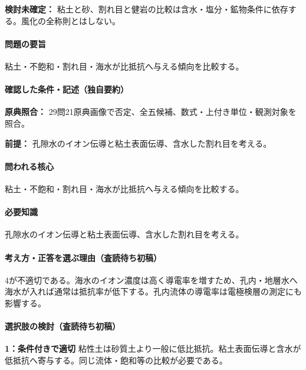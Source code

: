 \par\textbf{検討未確定：} 粘土と砂、割れ目と健岩の比較は含水・塩分・鉱物条件に依存する。風化の全称則とはしない。

\paragraph{問題の要旨} 粘土・不飽和・割れ目・海水が比抵抗へ与える傾向を比較する。

\paragraph{確認した条件・記述（独自要約）}\mbox{}\par

\noindent\textbf{原典照合：} 29問21原典画像で否定、全五候補、数式・上付き単位・観測対象を照合。\par

\noindent\textbf{前提：} 孔隙水のイオン伝導と粘土表面伝導、含水した割れ目を考える。\par

\paragraph{問われる核心} 粘土・不飽和・割れ目・海水が比抵抗へ与える傾向を比較する。

\paragraph{必要知識} 孔隙水のイオン伝導と粘土表面伝導、含水した割れ目を考える。

\paragraph{考え方・正答を選ぶ理由（査読待ち初稿）} 4が不適切である。海水のイオン濃度は高く導電率を増すため、孔内・地層水へ海水が入れば通常は抵抗率が低下する。孔内流体の導電率は電極検層の測定にも影響する。

\paragraph{選択肢の検討（査読待ち初稿）}\mbox{}\par

\noindent\textbf{1：条件付きで適切} 粘性土は砂質土より一般に低比抵抗。粘土表面伝導と含水が低抵抗へ寄与する。同じ流体・飽和等の比較が必要である。\par

